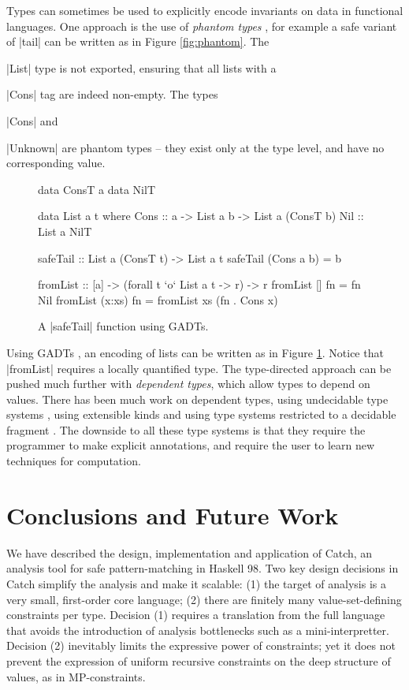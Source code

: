\documentclass[preprint]{sigplanconf}
\begin{document}
Types can sometimes be used to explicitly encode invariants on data in functional languages. One approach is the use of \textit{phantom types} \cite{fluet:phantom}, for example a safe variant of |tail| can be written as in Figure \ref{fig:phantom}. The \ignore|List| type is not exported, ensuring that all lists with a \ignore|Cons| tag are indeed non-empty. The types \ignore|Cons| and \ignore|Unknown| are phantom types -- they exist only at the type level, and have no corresponding value.

\begin{figure}
\ignore\begin{code}
data ConsT a
data NilT

data List a t where
    Cons  :: a -> List a b -> List a (ConsT b)
    Nil   :: List a NilT

safeTail :: List a (ConsT t) -> List a t
safeTail (Cons a b) = b

fromList :: [a] -> (forall t `o` List a t -> r) -> r
fromList []      fn = fn Nil
fromList (x:xs)  fn = fromList xs (fn . Cons x)
\end{code}
\caption{A |safeTail| function using GADTs.}
\label{fig:gadt}
\end{figure}

Using GADTs \cite{spj:gadt}, an encoding of lists can be written as in Figure \ref{fig:gadt}. Notice that |fromList| requires a locally quantified type. The type-directed approach can be pushed much further with \textit{dependent types}, which allow types to depend on values. There has been much work on dependent types, using undecidable type systems \cite{epigram}, using extensible kinds \cite{omega} and using type systems restricted to a decidable fragment \cite{xi:dependent_practical}. The downside to all these type systems is that they require the programmer to make explicit annotations, and require the user to learn new techniques for computation.


\section{Conclusions and Future Work}
\label{sec:conclusion}

We have described the design, implementation and application of Catch,
an analysis tool for safe pattern-matching in Haskell 98.  Two key
design decisions in Catch simplify the analysis and make it scalable:
(1) the target of analysis is a very small, first-order core language;
(2) there are finitely many value-set-defining constraints per type.
Decision (1) requires a translation from the full language that avoids
the introduction of analysis bottlenecks such as a mini-interpretter.
Decision (2) inevitably limits the expressive power of
constraints; yet it does not prevent the expression of uniform recursive
constraints on the deep structure of values, as in MP-constraints.
\end{document}
